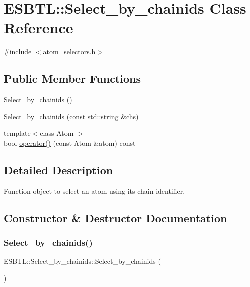 \hypertarget{classESBTL_1_1Select__by__chainids}{}\section{E\+S\+B\+TL\+:\+:Select\+\_\+by\+\_\+chainids Class Reference}
\label{classESBTL_1_1Select__by__chainids}


{\ttfamily \#include $<$atom\+\_\+selectors.\+h$>$}

\subsection*{Public Member Functions}
\begin{DoxyCompactItemize}
\item 
\hyperlink{classESBTL_1_1Select__by__chainids_aeb1e4f3a504e8feef137bda2586043d7}{Select\+\_\+by\+\_\+chainids} ()
\item 
\hyperlink{classESBTL_1_1Select__by__chainids_a742b7ffed9851414efd3b9439272cc96}{Select\+\_\+by\+\_\+chainids} (const std\+::string \&chs)
\item 
{\footnotesize template$<$class Atom $>$ }\\bool \hyperlink{classESBTL_1_1Select__by__chainids_ad59b92cc3d2e8a5b07f8f005aff10c47}{operator()} (const Atom \&atom) const
\end{DoxyCompactItemize}


\subsection{Detailed Description}
Function object to select an atom using its chain identifier. 

\subsection{Constructor \& Destructor Documentation}
\mbox{\label{classESBTL_1_1Select__by__chainids_aeb1e4f3a504e8feef137bda2586043d7}} 
\subsubsection{\texorpdfstring{Select\+\_\+by\+\_\+chainids()}{Select\_by\_chainids()}\hspace{0.1cm}{\footnotesize\ttfamily [1/2]}}
{\footnotesize\ttfamily E\+S\+B\+T\+L\+::\+Select\+\_\+by\+\_\+chainids\+::\+Select\+\_\+by\+\_\+chainids (\begin{DoxyParamCaption}{ }\end{DoxyParamCaption})\hspace{0.3cm}{\ttfamily [inline]}}

